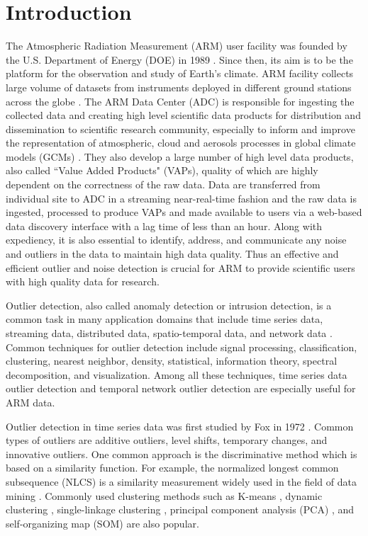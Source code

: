 \section{Introduction}
The Atmospheric Radiation Measurement (ARM) user facility was founded by
the U.S. Department of Energy (DOE) in 1989 \cite{ARM}. Since then, its
aim is to be the platform for the observation and study of Earth's
climate. ARM facility collects large volume of datasets from instruments deployed in
different ground stations across the globe \cite{stokes1994atmospheric}.
The ARM Data Center (ADC) is responsible for ingesting the collected data and
creating high level scientific data products for distribution and
dissemination to scientific research community, especially to inform and
improve the representation of atmospheric, cloud and aerosols
processes in global climate models (GCMs)
\cite{gaustad2014scientific}. They also develop a large number of 
high level data products, also
called ``Value Added Products" (VAPs), quality of which are highly dependent on the
correctness of the raw data. Data are transferred from individual site
to ADC in a streaming near-real-time fashion and the raw data is
ingested, processed to produce VAPs and made available to users via a
web-based data discovery interface with a lag time of less than an hour.
Along with expediency, it is also essential to identify, address, and 
communicate any noise and outliers in the data to maintain high data quality.
Thus an effective and efficient outlier and noise detection
is crucial for ARM to provide scientific users with high quality data
for research.

Outlier detection, also called anomaly detection or intrusion detection,
is a common task in many application domains that include time
series data, streaming data, distributed data, spatio-temporal
data, and network data \cite{gupta2014outlier}. Common
techniques for outlier detection include signal processing,
classification, clustering, nearest neighbor, density,
statistical, information theory, spectral decomposition, and
visualization. Among all these techniques, time series data
outlier detection and temporal network outlier detection are
especially useful for ARM data.

Outlier detection in time series data was first studied by Fox in 1972
\cite{fox1972outliers}. Common types of outliers are additive outliers,
level shifts, temporary changes, and innovative outliers. One common
approach is the discriminative method which is based on a similarity
function. For example, the normalized longest common subsequence
(NLCS) is a similarity measurement widely used in the field of data
mining \cite{budalakoti2009anomaly, chandola2008comparative,
sequeira2002admit}. Commonly used clustering methods such as
K-means \cite{macqueen1967some}, dynamic clustering
\cite{sequeira2002admit}, single-linkage clustering
\cite{portnoy2001intrusion}, principal component analysis (PCA)
\cite{gupta2013context}, and self-organizing map (SOM)
\cite{gonzalez2003anomaly} are also popular. 

